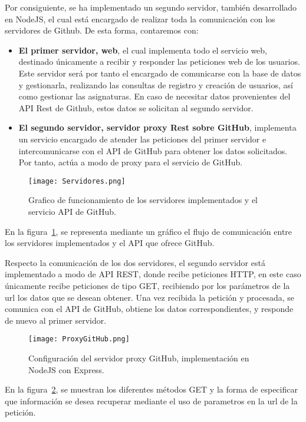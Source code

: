 Por consiguiente, se ha implementado un segundo servidor, también
desarrollado en NodeJS, el cual está encargado de realizar toda la
comunicación con los servidores de Github. De esta forma, contaremos con:

\begin{itemize}
\item \textbf{El primer servidor, web}, el cual implementa todo el
  servicio web, destinado únicamente a recibir y responder las peticiones
  web de los usuarios. Este servidor será por tanto el encargado de
  comunicarse con la base de datos y gestionarla, realizando las consultas
  de registro y creación de usuarios, así como gestionar las asignaturas.
  En caso de necesitar datos provenientes del API Rest de Github, estos
  datos se solicitan al segundo servidor.
\item \textbf{El segundo servidor, servidor proxy Rest sobre GitHub},
  implementa un servicio encargado de atender las peticiones del primer
  servidor e intercomunicarse con el API de GitHub para obtener los datos
  solicitados. Por tanto, actúa a modo de proxy para el servicio de GitHub.
\end{itemize}

\begin{figure}[h!]
  \texttt{[image: Servidores.png]}
  \caption{Grafico de funcionamiento de los servidores implementados y el
    servicio API de GitHub.}
  \label{figure:servidores}
\end{figure}

En la figura~\ref{figure:servidores}, se representa mediante un gráfico el
flujo de comunicación entre los servidores implementados y el API que
ofrece GitHub.

Respecto la comunicación de los dos servidores, el segundo servidor está
implementado a modo de API REST, donde recibe peticiones HTTP, en este caso
únicamente recibe peticiones de tipo GET, recibiendo por los parámetros de
la url los datos que se desean obtener. Una vez recibida la petición y
procesada, se comunica con el API de GitHub, obtiene los datos
correspondientes, y responde de nuevo al primer servidor.

\begin{figure}[h!]
  \texttt{[image: ProxyGitHub.png]}
  \caption{Configuración del servidor proxy GitHub, implementación en
    NodeJS con Express.}
  \label{figure:ProxyGitHub}
\end{figure}

En la figura~\ref{figure:ProxyGitHub}, se muestran los diferentes métodos
GET y la forma de especificar que información se desea recuperar mediante
el uso de parametros en la url de la petición.


